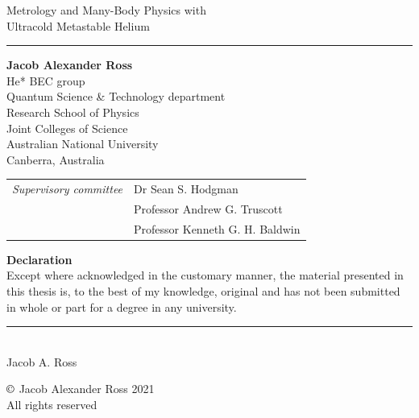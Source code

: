 \newpage
\begin{flushleft}
\Large{Metrology and Many-Body Physics with \\Ultracold Metastable Helium}
\vspace{0.1cm}
\hrule
\vspace{1cm}
\large{\textbf{Jacob Alexander Ross\\}}
He* BEC group\\
Quantum Science \& Technology department\\
Research School of Physics\\
Joint Colleges of Science\\
Australian National University\\
Canberra, Australia

\vspace{1cm}
\begin{table}[h]
\begin{tabular}{c l}
\emph{\large{Supervisory committee}} & \large{Dr Sean S. Hodgman}\\
                              & \large{Professor Andrew G. Truscott}\\
                              & \large{Professor Kenneth G. H. Baldwin}
\end{tabular}
\end{table}

\vspace{2cm}
\large{\textbf{Declaration\\}}
Except where acknowledged in the customary manner, the material presented in this thesis is, to the best of my knowledge, original and has not been submitted in whole or part for a degree in any university.\\
\end{flushleft}
\begin{flushright}
\vspace{0.5cm}
\rule{3cm}{1pt}\\
Jacob A. Ross
\end{flushright}

\vfill
\begin{center}
\small{$\copyright$ Jacob Alexander Ross 2021\\
All rights reserved}
\end{center}

